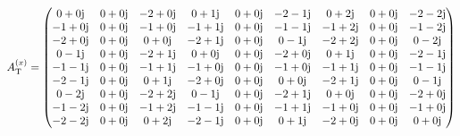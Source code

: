 {\footnotesize
\begin{equation}
A^{(x)}_\mathrm{T}=
\begin{pmatrix}
  0+0\mathrm{j}&  0+0\mathrm{j}&  -2+0\mathrm{j}&   0+1\mathrm{j}&  0+0\mathrm{j}& -2-1\mathrm{j}&   0+2\mathrm{j}&  0+0\mathrm{j}& -2-2\mathrm{j}\\ 
  -1+0\mathrm{j}&   0+0\mathrm{j}&  -1+0\mathrm{j}&  -1+1\mathrm{j}&   0+0\mathrm{j}& -1-1\mathrm{j}&  -1+2\mathrm{j}&   0+0\mathrm{j}& -1-2\mathrm{j}\\ 
  -2+0\mathrm{j}&   0+0\mathrm{j}&   0+0\mathrm{j}&  -2+1\mathrm{j}&   0+0\mathrm{j}&  0-1\mathrm{j}&  -2+2\mathrm{j}&   0+0\mathrm{j}&  0-2\mathrm{j}\\ 
 0-1\mathrm{j}&  0+0\mathrm{j}&  -2+1\mathrm{j}&  0+0\mathrm{j}&  0+0\mathrm{j}&  -2+0\mathrm{j}&   0+1\mathrm{j}&  0+0\mathrm{j}& -2-1\mathrm{j}\\ 
 -1-1\mathrm{j}&   0+0\mathrm{j}&  -1+1\mathrm{j}&  -1+0\mathrm{j}&   0+0\mathrm{j}&  -1+0\mathrm{j}&  -1+1\mathrm{j}&   0+0\mathrm{j}& -1-1\mathrm{j}\\ 
 -2-1\mathrm{j}&   0+0\mathrm{j}&   0+1\mathrm{j}&  -2+0\mathrm{j}&   0+0\mathrm{j}&   0+0\mathrm{j}&  -2+1\mathrm{j}&   0+0\mathrm{j}&  0-1\mathrm{j}\\ 
 0-2\mathrm{j}&  0+0\mathrm{j}&  -2+2\mathrm{j}& 0-1\mathrm{j}&  0+0\mathrm{j}&  -2+1\mathrm{j}&  0+0\mathrm{j}&  0+0\mathrm{j}&  -2+0\mathrm{j}\\ 
 -1-2\mathrm{j}&   0+0\mathrm{j}&  -1+2\mathrm{j}& -1-1\mathrm{j}&   0+0\mathrm{j}&  -1+1\mathrm{j}&  -1+0\mathrm{j}&   0+0\mathrm{j}&  -1+0\mathrm{j}\\ 
 -2-2\mathrm{j}&   0+0\mathrm{j}&   0+2\mathrm{j}& -2-1\mathrm{j}&   0+0\mathrm{j}&   0+1\mathrm{j}&  -2+0\mathrm{j}&   0+0\mathrm{j}&   0+0\mathrm{j}
\end{pmatrix}
\end{equation}}

